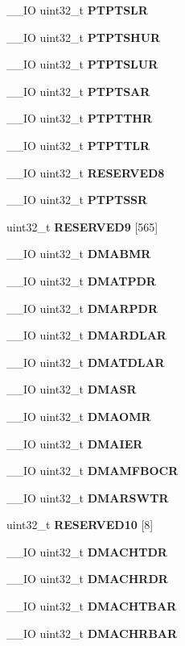 \begin{DoxyCompactItemize}
\+\_\+\+\_\+\+IO uint32\+\_\+t \textbf{ P\+T\+P\+T\+S\+LR}
\item 
\+\_\+\+\_\+\+IO uint32\+\_\+t \textbf{ P\+T\+P\+T\+S\+H\+UR}
\item 
\+\_\+\+\_\+\+IO uint32\+\_\+t \textbf{ P\+T\+P\+T\+S\+L\+UR}
\item 
\+\_\+\+\_\+\+IO uint32\+\_\+t \textbf{ P\+T\+P\+T\+S\+AR}
\item 
\+\_\+\+\_\+\+IO uint32\+\_\+t \textbf{ P\+T\+P\+T\+T\+HR}
\item 
\+\_\+\+\_\+\+IO uint32\+\_\+t \textbf{ P\+T\+P\+T\+T\+LR}
\item 
\+\_\+\+\_\+\+IO uint32\+\_\+t \textbf{ R\+E\+S\+E\+R\+V\+E\+D8}
\item 
\+\_\+\+\_\+\+IO uint32\+\_\+t \textbf{ P\+T\+P\+T\+S\+SR}
\item 
uint32\+\_\+t \textbf{ R\+E\+S\+E\+R\+V\+E\+D9} [565]
\item 
\+\_\+\+\_\+\+IO uint32\+\_\+t \textbf{ D\+M\+A\+B\+MR}
\item 
\+\_\+\+\_\+\+IO uint32\+\_\+t \textbf{ D\+M\+A\+T\+P\+DR}
\item 
\+\_\+\+\_\+\+IO uint32\+\_\+t \textbf{ D\+M\+A\+R\+P\+DR}
\item 
\+\_\+\+\_\+\+IO uint32\+\_\+t \textbf{ D\+M\+A\+R\+D\+L\+AR}
\item 
\+\_\+\+\_\+\+IO uint32\+\_\+t \textbf{ D\+M\+A\+T\+D\+L\+AR}
\item 
\+\_\+\+\_\+\+IO uint32\+\_\+t \textbf{ D\+M\+A\+SR}
\item 
\+\_\+\+\_\+\+IO uint32\+\_\+t \textbf{ D\+M\+A\+O\+MR}
\item 
\+\_\+\+\_\+\+IO uint32\+\_\+t \textbf{ D\+M\+A\+I\+ER}
\item 
\+\_\+\+\_\+\+IO uint32\+\_\+t \textbf{ D\+M\+A\+M\+F\+B\+O\+CR}
\item 
\+\_\+\+\_\+\+IO uint32\+\_\+t \textbf{ D\+M\+A\+R\+S\+W\+TR}
\item 
uint32\+\_\+t \textbf{ R\+E\+S\+E\+R\+V\+E\+D10} [8]
\item 
\+\_\+\+\_\+\+IO uint32\+\_\+t \textbf{ D\+M\+A\+C\+H\+T\+DR}
\item 
\+\_\+\+\_\+\+IO uint32\+\_\+t \textbf{ D\+M\+A\+C\+H\+R\+DR}
\item 
\+\_\+\+\_\+\+IO uint32\+\_\+t \textbf{ D\+M\+A\+C\+H\+T\+B\+AR}
\item 
\+\_\+\+\_\+\+IO uint32\+\_\+t \textbf{ D\+M\+A\+C\+H\+R\+B\+AR}
\end{DoxyCompactItemize}


